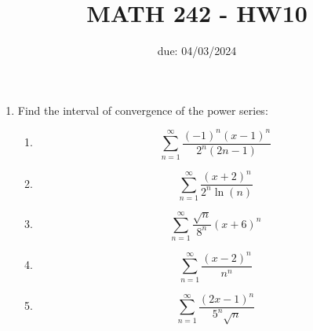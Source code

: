 \documentclass[12pt]{article}
\title{MATH 242 - HW10}
\date{due: 04/03/2024}
\begin{document}
\maketitle

\begin{enumerate}

\item Find the interval of convergence of the power series:
\begin{enumerate}
    \item $$\sum_{n=1}^{\infty}\frac{(-1)^n(x-1)^n}{2^n(2n-1)}$$
    \newpage
    \item $$\sum_{n=1}^{\infty}\frac{(x+2)^n}{2^n\ln(n)}$$
    \vfill
    \item $$\sum_{n=1}^{\infty}\frac{\sqrt{n}}{8^n}(x+6)^n$$
    \vfill
    \newpage
    \item $$\sum_{n=1}^{\infty}\frac{(x-2)^n}{n^n}$$
    \vfill
    \item $$\sum_{n=1}^{\infty}\frac{(2x-1)^{n}}{5^n\sqrt{n}}$$
    \vfill
    
\end{enumerate}

\end{enumerate}
\end{document}
